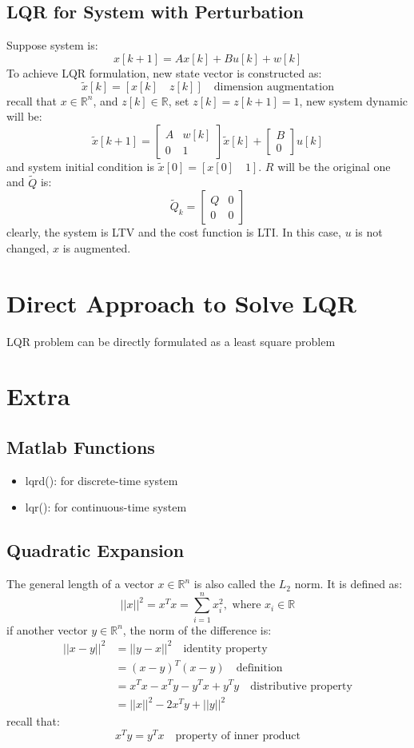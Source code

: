\documentclass[10pt,a4paper,oneside]{article}
\begin{document}
\subsection{LQR for System with Perturbation}
Suppose system is:
\[
x[k+1] = Ax[k] + Bu[k] + w[k]
\]
To achieve LQR formulation, new state vector is constructed as:
\[
\tilde{x}[k] = [x[k] \quad z[k]] \quad \text{dimension augmentation}
\]
recall that $x \in \mathbb{R}^n$, and $z[k] \in \mathbb{R}$, set $z[k] = z[k+1] =1$, new system dynamic will be:
\[
\tilde{x}[k+1] = \begin{bmatrix}
A & w[k] \\ 0& 1
\end{bmatrix} \tilde{x}[k] + \begin{bmatrix}
B \\ 0
\end{bmatrix} u[k]
\]
and system initial condition is $\tilde{x}[0] = [x[0] \quad 1]$. $R$ will be the original one and $\tilde{Q}$ is:
\[
\tilde{Q}_k = \begin{bmatrix}
Q & 0\\
0 & 0
\end{bmatrix}
\]
clearly, the system is LTV and the cost function is LTI. In this case, $u$ is not changed, $x$ is augmented.

\section{Direct Approach to Solve LQR}
LQR problem can be directly formulated as a least square problem



\section{Extra}

\subsection{Matlab Functions}
\begin{itemize}
	\item lqrd(): for discrete-time system
	\item lqr(): for continuous-time system
\end{itemize}

\subsection{Quadratic Expansion}
The general length of a vector $x \in \mathbb{R}^n$ is also called the $L_2$ norm. It is defined as:
\[
||x||^2 = x^T x = \sum_{i=1}^{n} x_i ^2, \text{ where } x_i \in \mathbb{R} 
\]
if another vector $y \in \mathbb{R}^n$, the norm of the difference is:
\begin{align*}
||x-y||^2 &= ||y-x||^2 \quad \text{identity property}\\
& = (x-y)^T (x-y) \quad \text{definition}\\
& = x^Tx - x^Ty - y^Tx + y^Ty \quad \text{distributive property}\\
& = ||x||^2 -2x^Ty +||y||^2
\end{align*}
recall that:
\[
x^Ty = y^Tx \quad \text{property of inner product}
\]
\end{document}
